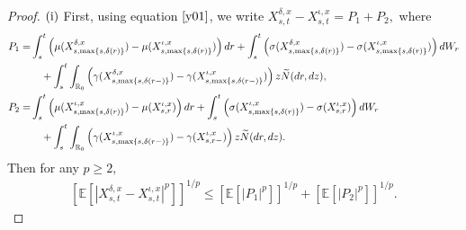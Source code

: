\documentclass[11pt]{article}
\theoremstyle{theorem}
\theoremstyle{definition}
\newcommand{\bR}{\mathbb{R}}
\newcommand{\1}{{\bf 1}}
\begin{document}
\begin{proof}
 $\textup{(i)}$ 
First, using equation $\eqref{y01}$, we write $X^{\delta, x}_{s,t}-X^{\iota, x}_{s,t} = P_1 + P_2,$ where
\begin{align*}
  P_1 = &\int_s^t \left(\mu(X_{s,\max\{s,\delta(r)\}}^{\delta,x}) - \mu(X_{s,\max\{s,\delta(r)\}}^{\iota,x})\right) dr + \int_s^t \left( \sigma(X_{s,\max\{s,\delta(r)\}}^{\delta,x}) - \sigma(X_{s,\max\{s,\delta(r)\}}^{\iota,x}) \right) dW_r \notag \\
   & \quad + \int_s^t \int_{\bR_0} \left(\gamma(X_{s,\max\{s,\delta(r-)\}}^{\delta,x})-\gamma(X_{s,\max\{s,\delta(r-)\}}^{\iota,x}) \right) z \widetilde{N}(dr, dz),  \\
    P_2 =  & \int_s^t \left(\mu(X_{s,\max\{s,\delta(r)\}}^{\iota,x}) - \mu(X_{s,r}^{\iota,x}) \right) dr + \int_s^t \left( \sigma(X_{s,\max\{s,\delta(r)\}}^{\iota,x}) - \sigma(X_{s,r}^{\iota,x}) \right) dW_r \notag \\
   & \quad + \int_s^t \int_{\bR_0} \left(\gamma(X_{s,\max\{s,\delta(r-)\}}^{\iota,x})-\gamma(X_{s,r-}^{\iota,x})\right) z \widetilde{N}(dr, dz).
\end{align*}
Then for any $p \ge 2,$ 
\begin{align}
\label{P1,2}
\left[\mathbb{E}\left[\left|X^{\delta, x}_{s,t}-X^{\iota, x}_{s,t}\right|^p\right]\right]^{1/p} \le \left[\mathbb{E}\left[\left|P_1\right|^p\right]\right]^{1/p} + \left[\mathbb{E}\left[\left|P_2\right|^p\right]\right]^{1/p}.    
\end{align}


\end{proof}
\end{document}
